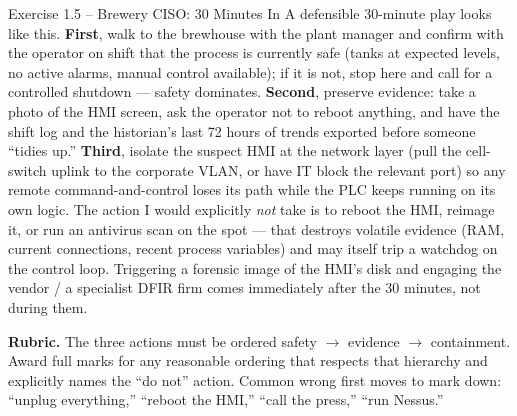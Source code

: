 \documentclass[11pt,a4paper]{article}
\begin{document}
\begin{solutionbox}{Exercise 1.5 -- Brewery CISO: 30 Minutes In}
A defensible 30-minute play looks like this. \textbf{First}, walk to the brewhouse with the plant manager and confirm with the operator on shift that the process is currently safe (tanks at expected levels, no active alarms, manual control available); if it is not, stop here and call for a controlled shutdown --- safety dominates. \textbf{Second}, preserve evidence: take a photo of the HMI screen, ask the operator not to reboot anything, and have the shift log and the historian's last 72 hours of trends exported before someone ``tidies up.'' \textbf{Third}, isolate the suspect HMI at the network layer (pull the cell-switch uplink to the corporate VLAN, or have IT block the relevant port) so any remote command-and-control loses its path while the PLC keeps running on its own logic. The action I would explicitly \emph{not} take is to reboot the HMI, reimage it, or run an antivirus scan on the spot --- that destroys volatile evidence (RAM, current connections, recent process variables) and may itself trip a watchdog on the control loop. Triggering a forensic image of the HMI's disk and engaging the vendor / a specialist DFIR firm comes immediately after the 30 minutes, not during them.

\textbf{Rubric.} The three actions must be ordered safety $\to$ evidence $\to$ containment. Award full marks for any reasonable ordering that respects that hierarchy and explicitly names the ``do not'' action. Common wrong first moves to mark down: ``unplug everything,'' ``reboot the HMI,'' ``call the press,'' ``run Nessus.''
\end{solutionbox}
\end{document}
